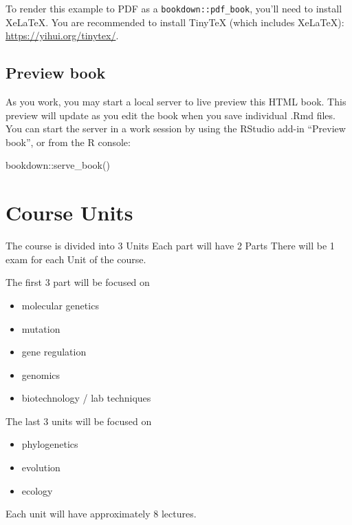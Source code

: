 \documentclass[
]{book}
\newenvironment{Shaded}{\begin{snugshade}}{\end{snugshade}}
\newcommand{\FunctionTok}[1]{\textcolor[rgb]{0.00,0.00,0.00}{#1}}
\newcommand{\NormalTok}[1]{#1}
\newcommand{\SpecialCharTok}[1]{\textcolor[rgb]{0.00,0.00,0.00}{#1}}
\providecommand{\tightlist}{%
  \setlength{\itemsep}{0pt}\setlength{\parskip}{0pt}}
\begin{document}
To render this example to PDF as a \texttt{bookdown::pdf\_book}, you'll need to install XeLaTeX. You are recommended to install TinyTeX (which includes XeLaTeX): \url{https://yihui.org/tinytex/}.

\hypertarget{preview-book}{%
\section{Preview book}\label{preview-book}}

As you work, you may start a local server to live preview this HTML book. This preview will update as you edit the book when you save individual .Rmd files. You can start the server in a work session by using the RStudio add-in ``Preview book'', or from the R console:

\begin{Shaded}
\begin{Highlighting}[]
\NormalTok{bookdown}\SpecialCharTok{::}\FunctionTok{serve\_book}\NormalTok{()}
\end{Highlighting}
\end{Shaded}

\hypertarget{course-units}{%
\chapter{Course Units}\label{course-units}}

The course is divided into 3 Units Each part will have 2 Parts
There will be 1 exam for each Unit of the course.

The first 3 part will be focused on

\begin{itemize}
\tightlist
\item
  molecular genetics
\item
  mutation
\item
  gene regulation
\item
  genomics
\item
  biotechnology / lab techniques
\end{itemize}

The last 3 units will be focused on

\begin{itemize}
\tightlist
\item
  phylogenetics
\item
  evolution
\item
  ecology
\end{itemize}

Each unit will have approximately 8 lectures.
\end{document}
